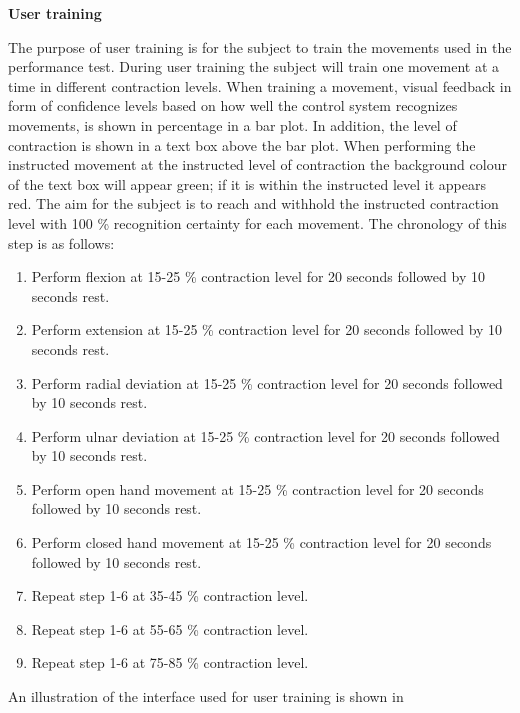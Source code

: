 \textbf{User training} %

The purpose of user training is for the subject to train the movements used in the performance test. During user training the subject will train one movement at a time in different contraction levels. When training a movement, visual feedback in form of confidence levels based on how well the control system recognizes movements, is shown in percentage in a bar plot. In addition, the level of contraction is shown in a text box above the bar plot. When performing the instructed movement at the instructed level of contraction the background colour of the text box will appear green; if it is within the instructed level it appears red. The aim for the subject is to reach and withhold the instructed contraction level with 100 \% recognition certainty for each movement. The chronology of this step is as follows:

\begin{enumerate}
	\item Perform flexion at 15-25 \% contraction level for 20 seconds followed by 10 seconds rest.
	\item Perform extension at 15-25 \% contraction level for 20 seconds followed by 10 seconds rest.
	\item Perform radial deviation at 15-25 \% contraction level for 20 seconds followed by 10 seconds rest.
	\item Perform ulnar deviation at 15-25 \% contraction level for 20 seconds followed by 10 seconds rest.
	\item Perform open hand movement at 15-25 \% contraction level for 20 seconds followed by 10 seconds rest.
	\item Perform closed hand movement at 15-25 \% contraction level for 20 seconds followed by 10 seconds rest.
	\item Repeat step 1-6 at 35-45 \% contraction level.
	\item Repeat step 1-6 at 55-65 \% contraction level.
	\item Repeat step 1-6 at 75-85 \% contraction level.
\end{enumerate} 

An illustration of the interface used for user training is shown in 

